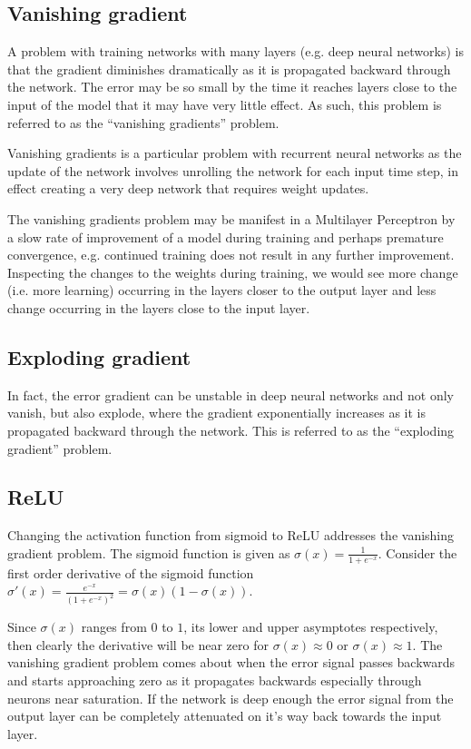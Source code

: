 \documentclass{article}
\begin{document}
\subsection{Vanishing gradient}

A problem with training networks with many layers (e.g. deep neural networks) is that the gradient diminishes dramatically as it is propagated backward through the network. The error may be so small by the time it reaches layers close to the input of the model that it may have very little effect. As such, this problem is referred to as the ``vanishing gradients'' problem.

Vanishing gradients is a particular problem with recurrent neural networks as the update of the network involves unrolling the network for each input time step, in effect creating a very deep network that requires weight updates.

The vanishing gradients problem may be manifest in a Multilayer Perceptron by a slow rate of improvement of a model during training and perhaps premature convergence, e.g. continued training does not result in any further improvement. Inspecting the changes to the weights during training, we would see more change (i.e. more learning) occurring in the layers closer to the output layer and less change occurring in the layers close to the input layer.

\subsection{Exploding gradient}

In fact, the error gradient can be unstable in deep neural networks and not only vanish, but also explode, where the gradient exponentially increases as it is propagated backward through the network. This is referred to as the ``exploding gradient'' problem.

\subsection{ReLU}
Changing the activation function from sigmoid to ReLU addresses the vanishing gradient problem.
The sigmoid function is given as $\sigma(x) = \frac{1}{1 + e^{-x}}$.  Consider the first order derivative of the sigmoid function $\sigma'(x) = \frac{e^{-x}}{(1 + e^{-x})^2} = \sigma(x)(1-\sigma(x))$.

Since  $\sigma(x)$  ranges from $0$ to $1$, its lower and upper asymptotes respectively, then clearly the derivative will be near zero for $\sigma(x) \approx 0$ or $\sigma(x) \approx 1$. The vanishing gradient problem comes about when the error signal passes backwards and starts approaching zero as it propagates backwards especially through neurons near saturation. If the network is deep enough the error signal from the output layer can be completely attenuated on it's way back towards the input layer.
\end{document}

